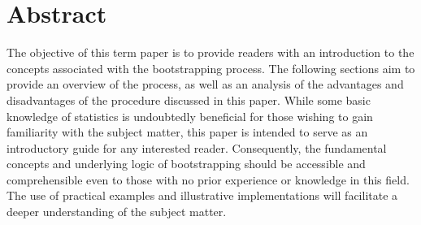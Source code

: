 

\section*{Abstract}

The objective of this term paper is to provide readers with an introduction 
to the concepts associated with the bootstrapping process. 
The following sections aim to provide an overview of the process, 
as well as an analysis of the advantages and disadvantages of the procedure 
discussed in this paper. While some basic knowledge of statistics is undoubtedly 
beneficial for those wishing to gain familiarity with the subject matter, 
this paper is intended to serve as an introductory guide for any interested 
reader. Consequently, the fundamental concepts and underlying logic of 
bootstrapping should be accessible and comprehensible even to those with 
no prior experience or knowledge in this field. The use of practical examples 
and illustrative implementations will facilitate a deeper understanding of the 
subject matter. 

